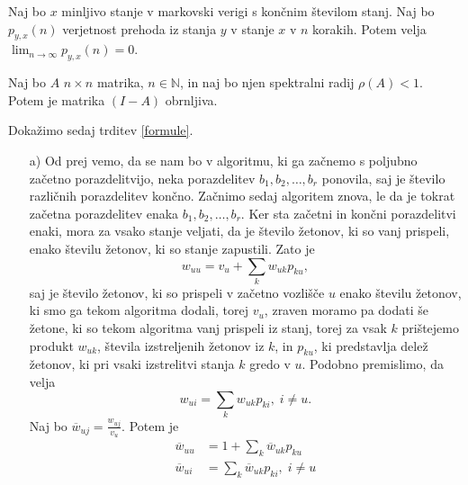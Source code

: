 \documentclass[twoside,11pt]{article}
\begin{document}
\begin{lema}\label{markovske}
    Naj bo $x$ minljivo stanje v markovski verigi s končnim številom stanj. Naj bo $p_{y,x}(n)$ verjetnost prehoda iz stanja $y$ v stanje $x$ v $n$ korakih. Potem velja $\lim_{n \to \infty} p_{y,x}(n) = 0$.
\end{lema}

\begin{lema}\label{matrike}
    Naj bo $A$ $n\times n$ matrika, $n \in \mathbb{N}$, in naj bo njen spektralni radij $\rho(A)<1$. Potem je matrika $(I-A)$ obrnljiva.
\end{lema}


\noindent Dokažimo sedaj trditev \ref{formule}. \newline
\smallskip

\begin{enumerate}
    \item[a)] Od prej vemo, da se nam bo v algoritmu, ki ga začnemo s poljubno začetno porazdelitvijo, neka porazdelitev $b_{1},b_{2},\ldots,b_{r}$ ponovila, saj je število različnih porazdelitev končno. Začnimo sedaj algoritem znova, le da je tokrat začetna porazdelitev enaka $b_{1},b_{2},\ldots,b_{r}$. Ker sta začetni in končni porazdelitvi enaki, mora za vsako stanje veljati, da je število žetonov, ki so vanj prispeli, enako številu žetonov, ki so stanje zapustili. Zato je 
$$w_{uu} = v_{u} + \sum_{k} w_{uk}p_{ku},$$ saj je število žetonov, ki so prispeli v začetno vozlišče $u$ enako številu žetonov, ki smo ga tekom algoritma dodali, torej $v_{u}$, zraven moramo pa dodati še žetone, ki so tekom algoritma vanj prispeli iz stanj, torej za vsak $k$ prištejemo produkt $w_{uk}$, števila izstreljenih žetonov iz $k$, in $p_{ku}$, ki predstavlja delež žetonov, ki pri vsaki izstrelitvi stanja $k$ gredo v $u$. 
Podobno premislimo, da velja
$$w_{ui} = \sum_{k} w_{uk}p_{ki}, \;i\neq u.$$
Naj bo $\overline{w}_{uj} = \frac{w_{uj}}{v_{u}}$. Potem je 
\[
    \begin{split}
        \overline{w}_{uu} &= 1 + \sum_{k} \overline{w}_{uk}p_{ku} \\
        \overline{w}_{ui} &= \sum_{k} \overline{w}_{uk}p_{ki}, \; i \neq u
    \end{split}
\]


\end{enumerate}
\end{document}
